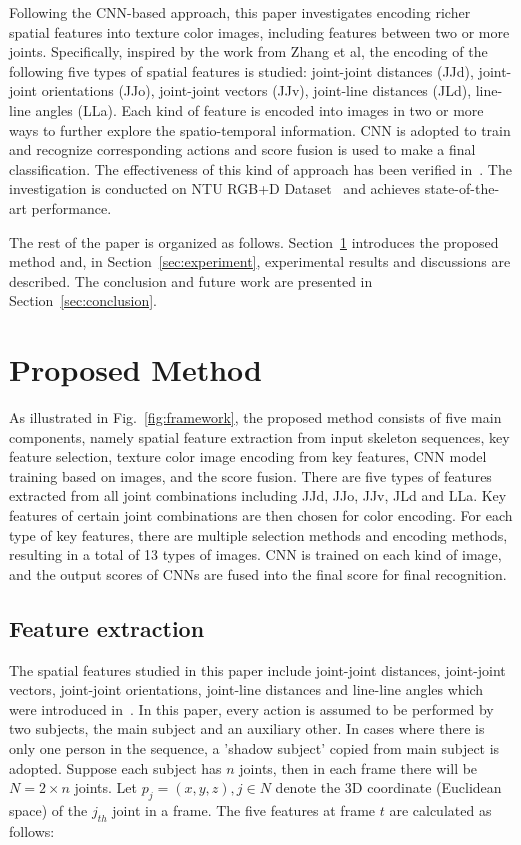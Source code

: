 \documentclass[5pt]{article}
\begin{document}
Following the CNN-based approach, this paper investigates encoding richer 
spatial features into texture color images, including features between two or 
more joints. Specifically, inspired by the work from Zhang et 
al\cite{Zhang2017}, the encoding of the following five types of spatial 
features is studied: joint-joint distances (JJd), joint-joint orientations 
(JJo), joint-joint vectors (JJv), joint-line distances (JLd), line-line angles 
(LLa). Each kind of feature is encoded into images in two or more ways to 
further explore the spatio-temporal information. CNN is adopted to train and 
recognize corresponding actions and score fusion is used to make a final 
classification. The effectiveness of this kind of approach has been verified 
in~\cite{Wang2016,Li2017,Wang2015}. The investigation is conducted on NTU RGB+D 
Dataset~\cite{Shahroudy2016} and achieves state-of-the-art performance.

The rest of the paper is organized as follows. Section~\ref{sec:method} 
introduces the proposed method and, in Section~\ref{sec:experiment}, 
experimental results and discussions are described. The conclusion and future 
work are presented in Section~\ref{sec:conclusion}.
	



\section{Proposed Method}
\label{sec:method}
As illustrated in Fig.~\ref{fig:framework}, the proposed method consists of five 
main components, namely spatial feature extraction from input skeleton 
sequences, key feature selection, texture color image encoding from key 
features, CNN model training based on images, and the score fusion. There are 
five types of features extracted from all joint combinations including JJd, 
JJo, JJv, JLd and LLa. Key features of certain joint combinations are then 
chosen for color encoding. For each type of key features, there are multiple 
selection methods and encoding methods, resulting in a total of 13 types 
of images. CNN is trained on each kind of image, and the output scores of CNNs 
are fused into the final score for final recognition. 

\subsection{Feature extraction}
The spatial features studied in this paper include joint-joint distances, 
joint-joint vectors, joint-joint orientations, joint-line distances and 
line-line angles which were introduced in~\cite{Zhang2017}. In this paper, 
every action is assumed to be performed by two subjects, the main subject and 
an auxiliary other. In cases where there is only one person in the sequence, a 
'shadow subject' copied from main subject is adopted. Suppose each subject has 
$n$ joints, then in each frame there will be $N=2\times n$ joints. Let 
$p_j=(x,y,z),j\in N$ denote the 3D coordinate (Euclidean space) of the $j_{th}$ 
joint in a frame. The five features at frame $t$ are calculated as follows:
	
\end{document}
